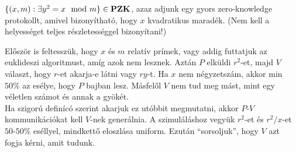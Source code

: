\begin{Exercise}[counter={sorszam}, difficulty=0]
	$\{(x,m): \exists y^2=x \mod m\}\in {\mbox{\ensuremath{\mathbf{PZK}}}}$, azaz adjunk egy gyors zero-knowledge protokollt, amivel bizony\'ithat\'o, hogy $x$ kvadratikus marad\'ek. (Nem kell a helyess\'eget teljes r\'eszletess\'eggel bizony\'itani!)
\end{Exercise}	
\begin{Answer}
	El\H osz\"or is feltessz\"uk, hogy $x$ \'es $m$ relat\'iv pr\'imek, vagy addig futtatjuk az euklideszi algoritmust, am\'ig azok nem lesznek.
	Azt\'an $P$ elk\"uldi $r^2$-et, majd $V$ v\'alaszt, hogy $r$-et akarja-e l\'atni vagy $ry$-t.
	Ha $x$ nem n\'egyzetsz\'am, akkor min $50\%$ az es\'elye, hogy $P$ bajban lesz.
	M\'asfel\H ol $V$ nem tud meg m\'ast, mint egy v\'eletlen sz\'amot \'es annak a gy\"ok\'et.\\	
	Ha szigor\'u defin\'ic\'o szerint akarjuk ez ut\'obbit megmutatni, akkor $P$-$V$ kommunik\'aci\'okat kell $V$-nek gener\'alnia. A szimul\'al\'ashoz vegy\"uk $r^2$-et \'es $r^2/x$-et $50$-$50\%$ es\'ellyel, mindkett\H o eloszl\'asa uniform.
	Ezut\'an ``sorsoljuk'', hogy $V$ azt fogja k\'erni, amit tudunk. 
\end{Answer}



